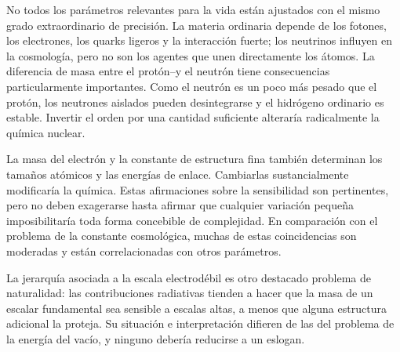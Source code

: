 No todos los parámetros relevantes para la vida están ajustados con el mismo grado extraordinario de precisión. La materia ordinaria depende de los fotones, los electrones, los quarks ligeros y la interacción fuerte; los neutrinos influyen en la cosmología, pero no son los agentes que unen directamente los átomos. La diferencia de masa entre el protón--y el neutrón tiene consecuencias particularmente importantes. Como el neutrón es un poco más pesado que el protón, los neutrones aislados pueden desintegrarse y el hidrógeno ordinario es estable. Invertir el orden por una cantidad suficiente alteraría radicalmente la química nuclear.

La masa del electrón y la constante de estructura fina también determinan los tamaños atómicos y las energías de enlace. Cambiarlas sustancialmente modificaría la química. Estas afirmaciones sobre la sensibilidad son pertinentes, pero no deben exagerarse hasta afirmar que cualquier variación pequeña imposibilitaría toda forma concebible de complejidad. En comparación con el problema de la constante cosmológica, muchas de estas coincidencias son moderadas y están correlacionadas con otros parámetros.

La jerarquía asociada a la escala electrodébil es otro destacado problema de naturalidad: las contribuciones radiativas tienden a hacer que la masa de un escalar fundamental sea sensible a escalas altas, a menos que alguna estructura adicional la proteja. Su situación e interpretación difieren de las del problema de la energía del vacío, y ninguno debería reducirse a un eslogan.

\begin{classroomqa}
\end{classroomqa}

\begin{classroomqa}
\end{classroomqa}

